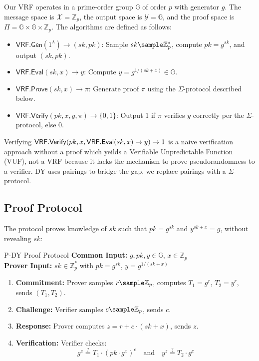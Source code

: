 Our VRF operates in a prime-order group $\mathbb{G}$ of order $p$ with generator $g$. The message space is $\mathcal{X} = \mathbb{Z}_p$, the output space is $\mathcal{Y} = \mathbb{G}$, and the proof space is $\Pi = \mathbb{G} \times \mathbb{G} \times \mathbb{Z}_p$. The algorithms are defined as follows:

\begin{itemize}
    \item $\mathsf{VRF.Gen}(1^\lambda) \to (sk, pk)$: Sample $sk \sample \mathbb{Z}_p^*$, compute $pk = g^{sk}$, and output $(sk, pk)$.
    \item $\mathsf{VRF.Eval}(sk, x) \to y$: Compute $y = g^{1/(sk + x)} \in \mathbb{G}$.
    \item $\mathsf{VRF.Prove}(sk, x) \to \pi$: Generate proof $\pi$ using the $\Sigma$-protocol described below.
    \item $\mathsf{VRF.Verify}(pk, x, y, \pi) \to \{0, 1\}$: Output 1 if $\pi$ verifies $y$ correctly per the $\Sigma$-protocol, else 0.
\end{itemize}

\begin{remark}
    Verifying $\mathsf{VRF.Verify}(pk, x, \mathsf{VRF.Eval}(sk, x) \to y) \to 1$ is a naive verification approach without a proof which yeilds a Verifiable Unpredictable Function (VUF), not a VRF because it lacks the mechanism to prove pseudorandomness to a verifier. DY uses pairings to bridge the gap, we replace pairings with a $\Sigma$-protocol. 
\end{remark}

\subsection{Proof Protocol}
The protocol proves knowledge of $sk$ such that $pk = g^{sk}$ and $y^{sk + x} = g$, without revealing $sk$:

\begin{protocol}{P-DY Proof Protocol}{}\label{protocol-pdy-protocol1}
\textbf{Common Input:} $g, pk, y \in \mathbb{G}$, $x \in \mathbb{Z}_p$ \\
\textbf{Prover Input:} $sk \in \mathbb{Z}_p^*$ with $pk = g^{sk}$, $y = g^{1/(sk + x)}$
\begin{enumerate}
    \item \textbf{Commitment:} Prover samples $r \sample  \mathbb{Z}_p$, computes $T_1 = g^r$, $T_2 = y^r$, sends $(T_1, T_2)$.
    \item \textbf{Challenge:} Verifier samples $c \sample  \mathbb{Z}_p$, sends $c$.
    \item \textbf{Response:} Prover computes $z = r + c \cdot (sk + x)$, sends $z$.
    \item \textbf{Verification:} Verifier checks:
    \[
    g^z \stackrel{?}{=} T_1 \cdot (pk \cdot g^x)^c \quad \text{and} \quad y^z \stackrel{?}{=} T_2 \cdot g^c
    \]
\end{enumerate}
\end{protocol}

